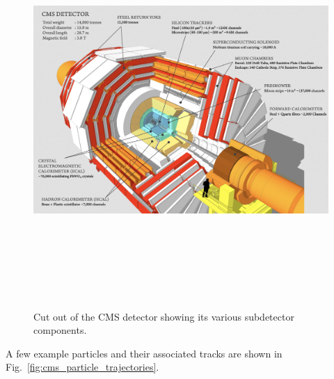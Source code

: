 \begin{figure}[pbth]
\centering
\includegraphics[width=15cm,height=15cm,keepaspectratio]{figures/cms/cms_cut_away.png}
    \caption{Cut out of the CMS detector showing its various subdetector components.} 
    \label{fig:cms_cut_out_view}
\end{figure}
A few example particles and their associated tracks are shown in Fig.~\ref{fig:cms_particle_trajectories}.

